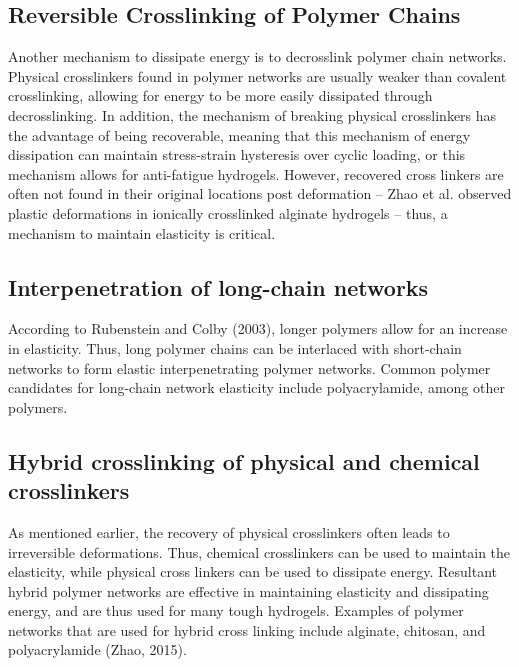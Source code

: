 \subsection{Reversible Crosslinking of Polymer Chains}
Another mechanism to dissipate energy is to decrosslink polymer chain networks. Physical crosslinkers found in polymer networks are usually weaker than covalent crosslinking, allowing for energy to be more easily dissipated through decrosslinking. In addition, the mechanism of breaking physical crosslinkers has the advantage of being recoverable, meaning that this mechanism of energy dissipation can maintain stress-strain hysteresis over cyclic loading, or this mechanism allows for anti-fatigue hydrogels. However, recovered cross linkers are often not found in their original locations post deformation – Zhao et al. observed plastic deformations in ionically crosslinked alginate hydrogels – thus, a mechanism to maintain elasticity is critical.

\subsection{Interpenetration of long-chain networks}
According to Rubenstein and Colby (2003), longer polymers allow for an increase in elasticity. Thus, long polymer chains can be interlaced with short-chain networks to form elastic interpenetrating polymer networks. Common polymer candidates for long-chain network elasticity include polyacrylamide, among other polymers.

\subsection{Hybrid crosslinking of physical and chemical crosslinkers}
As mentioned earlier, the recovery of physical crosslinkers often leads to irreversible deformations. Thus, chemical crosslinkers can be used to maintain the elasticity, while physical cross linkers can be used to dissipate energy. Resultant hybrid polymer networks are effective in maintaining elasticity and dissipating energy, and are thus used for many tough hydrogels. Examples of polymer networks that are used for hybrid cross linking include alginate, chitosan, and polyacrylamide (Zhao, 2015).

